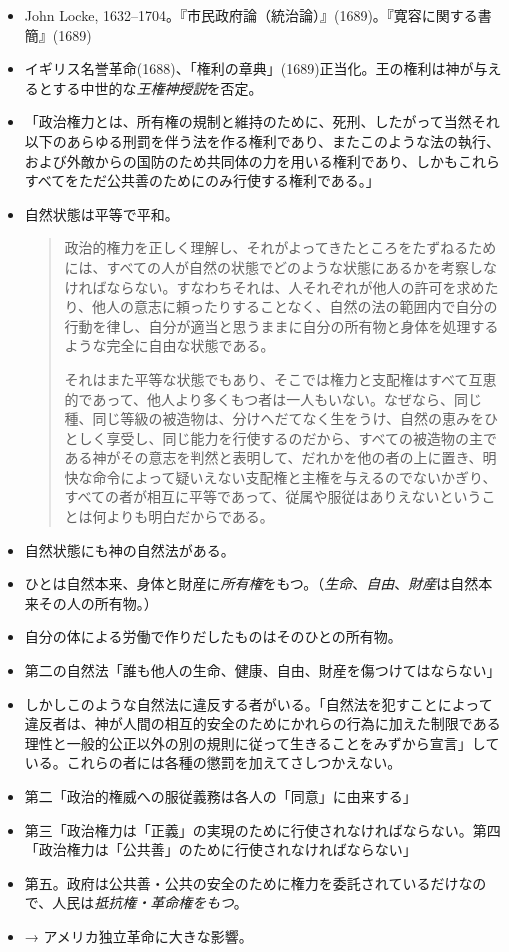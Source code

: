 \documentclass[uplatex,dvipdfmx]{jsarticle} \usepackage{mystyle}%
\begin{document}
\begin{itemize}

\item John Locke, 1632--1704。『市民政府論（統治論）』(1689)。『寛容に関する書簡』(1689)
\item イギリス名誉革命(1688)、「権利の章典」(1689)正当化。王の権利は神が与えるとする中世的な\emph{王権神授説}を否定。



\item 「政治権力とは、所有権の規制と維持のために、死刑、したがって当然それ以下のあらゆる刑罰を伴う法を作る権利であり、またこのような法の執行、および外敵からの国防のため共同体の力を用いる権利であり、しかもこれらすべてをただ公共善のためにのみ行使する権利である。」

\item 自然状態は平等で平和。

  \begin{quote} \small{}政治的権力を正しく理解し、それがよってきたところをたずねるためには、すべての人が自然の状態でどのような状態にあるかを考察しなければならない。すなわちそれは、人それぞれが他人の許可を求めたり、他人の意志に頼ったりすることなく、自然の法の範囲内で自分の行動を律し、自分が適当と思うままに自分の所有物と身体を処理するような完全に自由な状態である。

    それはまた平等な状態でもあり、そこでは権力と支配権はすべて互恵的であって、他人より多くもつ者は一人もいない。なぜなら、同じ種、同じ等級の被造物は、分けへだてなく生をうけ、自然の恵みをひとしく享受し、同じ能力を行使するのだから、すべての被造物の主である神がその意志を判然と表明して、だれかを他の者の上に置き、明快な命令によって疑いえない支配権と主権を与えるのでないかぎり、すべての者が相互に平等であって、従属や服従はありえないということは何よりも明白だからである。
  \end{quote}
  
\item 自然状態にも神の自然法がある。

\item ひとは自然本来、身体と財産に\emph{所有権}をもつ。（\emph{生命}、\emph{自由}、\emph{財産}は自然本来その人の所有物。）
\item 自分の体による労働で作りだしたものはそのひとの所有物。
\item 第二の自然法「誰も他人の生命、健康、自由、財産を傷つけてはならない」
\item しかしこのような自然法に違反する者がいる。「自然法を犯すことによって違反者は、神が人間の相互的安全のためにかれらの行為に加えた制限である理性と一般的公正以外の別の規則に従って生きることをみずから宣言」している。これらの者には各種の懲罰を加えてさしつかえない。
\item 第二「政治的権威への服従義務は各人の「同意」に由来する」
\item 第三「政治権力は「正義」の実現のために行使されなければならない。第四「政治権力は「公共善」のために行使されなければならない」
\item 第五。政府は公共善・公共の安全のために権力を委託されているだけなので、人民は\emph{抵抗権・革命権をもつ}。

\item → アメリカ独立革命に大きな影響。
\end{itemize}
\end{document}
